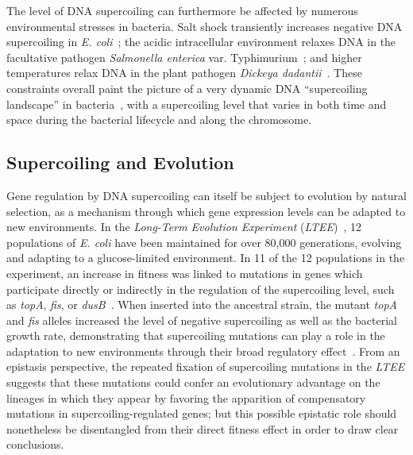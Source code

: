 The level of DNA supercoiling can furthermore be affected by numerous environmental stresses in bacteria.
Salt shock transiently increases negative DNA supercoiling in \emph{E. coli}~\citep{hsieh1991}; the acidic intracellular environment relaxes DNA in the facultative pathogen \emph{Salmonella enterica} var. Typhimurium~\citep{marshall2000}; and higher temperatures relax DNA in the plant pathogen \emph{Dickeya dadantii}~\citep{herault2014}.
These constraints overall paint the picture of a very dynamic DNA ``supercoiling landscape'' in bacteria~\citep{visser2022}, with a supercoiling level that varies in both time and space during the bacterial lifecycle and along the chromosome.

\subsection{Supercoiling and Evolution}

Gene regulation by DNA supercoiling can itself be subject to evolution by natural selection, as a mechanism through which gene expression levels can be adapted to new environments.
In the \emph{Long-Term Evolution Experiment} (\emph{LTEE})~\citep{lenski1991}, 12 populations of \emph{E. coli} have been maintained for over 80,000 generations, evolving and adapting to a glucose-limited environment.
In 11 of the 12 populations in the experiment, an increase in fitness was linked to mutations in genes which participate directly or indirectly in the regulation of the supercoiling level, such as \emph{topA}, \emph{fis}, or \emph{dusB}~\citep{crozat2010}.
When inserted into the ancestral strain, the mutant \emph{topA} and \emph{fis} alleles increased the level of negative supercoiling as well as the bacterial growth rate, demonstrating
that supercoiling mutations can play a role in the adaptation to new environments through their broad regulatory effect~\citep{crozat2005}.
From an epistasis perspective, the repeated fixation of supercoiling mutations in the \emph{LTEE} suggests that these mutations could confer an evolutionary advantage on the lineages in which they appear by favoring the apparition of compensatory mutations in supercoiling-regulated genes; but this possible epistatic role should nonetheless be disentangled from their direct fitness effect in order to draw clear conclusions.

